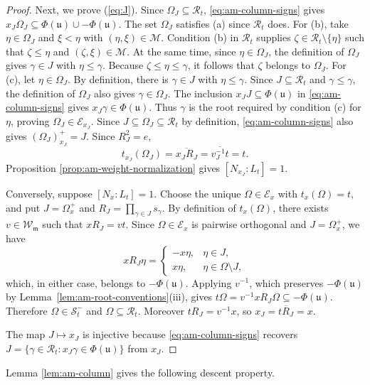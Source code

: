 \documentclass[12pt]{amsart}
\theoremstyle{definition}
\numberwithin{equation}{section}
\newcommand{\m}{\mathfrak m}
\newcommand{\W}{\mathscr W}
\begin{document}
\begin{proof}
Next, we prove (\ref{eq:J}). Since $\Omega_J\subseteq\mathscr{R}_t$, \eqref{eq:am-column-signs} gives
$x_J\Omega_J\subseteq\Phi(\mathfrak{u})\cup-\Phi(\mathfrak{u})$.
The set $\Omega_J$ satisfies (a) since $\mathscr{R}_t$ does.
For (b), take $\eta\in\Omega_J$ and $\xi<\eta$ with
$(\eta,\xi)\in\mathscr M$. Condition (b) in $\mathscr{R}_t$ supplies
$\zeta\in\mathscr{R}_t\setminus\{\eta\}$ such that
$\zeta\leq\eta$ and $(\zeta,\xi)\in\mathscr M$. At the same time, since $\eta\in\Omega_J$, the definition
of $\Omega_J$ gives $\gamma\in J$ with $\eta\leq\gamma$.
Because $\zeta\leq\eta\leq\gamma$, it follows that $\zeta$ belongs to
$\Omega_J$.
For (c), let $\eta\in\Omega_J$. By definition, there is
$\gamma\in J$ with $\eta\leq\gamma$.
Since $J\subseteq\mathscr{R}_t$ and $\gamma\leq\gamma$, the definition
of $\Omega_J$ also gives $\gamma\in\Omega_J$.
The inclusion $x_JJ\subseteq\Phi(\mathfrak{u})$ in \eqref{eq:am-column-signs} gives
$x_J\gamma\in\Phi(\mathfrak{u})$. Thus $\gamma$ is the root required
by condition (c) for $\eta$, proving $\Omega_J\in\mathscr E_{x_J}$.
Since $J\subseteq\Omega_J\subseteq\mathscr{R}_t$ by definition,
\eqref{eq:am-column-signs} also gives $(\Omega_J)_{x_J}^+=J$.
Since $R_J^2=e$,
\[
 t_{x_J}(\Omega_J)=\overline{x_JR_J}
 =\overline{v_J^{-1}t}=t.
\]
Proposition \ref{prop:am-weight-normalization} gives $[N_{x_J}:L_t]=1$.

Conversely, suppose $[N_x:L_t]=1$. Choose the unique
$\Omega\in\mathscr E_x$ with $t_x(\Omega)=t$, and put
$J=\Omega_x^+$ and $R_J=\prod_{\gamma\in J}s_\gamma$.
By definition of $t_x(\Omega)$, there exists $v\in\W_{\m}$ such that $xR_J=vt$.
Since $\Omega\in\mathscr E_x$ is pairwise orthogonal and
$J=\Omega_x^+$, we have
\[
xR_J\eta=
\begin{cases}
-x\eta,&\eta\in J,\\
 x\eta,&\eta\in\Omega\setminus J,
\end{cases}
\]
which, in either case, belongs to $-\Phi(\mathfrak{u})$. Applying $v^{-1}$, which preserves $-\Phi(\mathfrak{u})$ by
Lemma~\ref{lem:am-root-conventions}\textup{(iii)}, gives
$t\Omega=v^{-1}xR_J\Omega\subseteq-\Phi(\mathfrak{u})$.
Therefore $\Omega\in\mathscr S_t^-$ and $\Omega\subseteq\mathscr{R}_t$.
Moreover $tR_J=v^{-1}x$, so
$x_J=\overline{tR_J}=x$.

The map $J\mapsto x_J$ is injective because
\eqref{eq:am-column-signs} recovers
$J=\{\gamma\in\mathscr{R}_t:x_J\gamma\in\Phi(\mathfrak{u})\}$ from $x_J$.
\end{proof}


Lemma \ref{lem:am-column} gives the following descent property.
\end{document}
